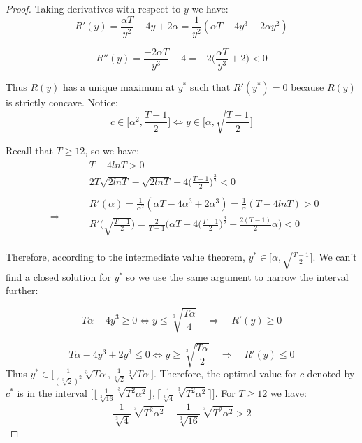 \documentclass[opre,nonblindrev]{informs3} %
\begin{document}
\begin{proof}
    Taking derivatives with respect to $y$ we have:
    \begin{equation}
        R'(y) = \frac{\alpha T}{y^2} - 4y + 2\alpha = \frac{1}{y^2}(\alpha T-4y^3+2\alpha y^2)
    \end{equation}
    
    \begin{equation}
        R''(y)=\frac{-2\alpha T}{y^3}-4=-2\bigg(\frac{\alpha T}{y^3}+2\bigg)<0
    \end{equation}
    
    Thus $R(y)$ has a unique maximum at $y^*$ such that $R'(y^*) = 0$ because $R(y)$ is strictly concave.
    Notice: 
    \begin{equation}
        c \in \bigg[\alpha^2, \frac{T-1}{2}\bigg] \iff y \in \bigg[\alpha, \sqrt{\frac{T-1}{2}}\bigg]
    \end{equation}
    
    Recall that $T\geq 12$, so we have:   
    \begin{align}
        &\begin{aligned}
            &T-4lnT > 0 \\
            &2T\sqrt{2lnT}-\sqrt{2lnT}-4\bigg(\frac{T-1}{2}\bigg)^{\frac{3}{2}} < 0
        \end{aligned} \\
        \quad \Longrightarrow \quad
        &\begin{aligned}
            &R'(\alpha) = \frac{1}{\alpha^2}(\alpha T-4\alpha^3+2\alpha^3)=\frac{1}{\alpha}(T-4lnT)>0 \\
            &R'\bigg(\sqrt{\frac{T-1}{2}}\bigg) = \frac{2}{T-1}\bigg(\alpha T -4\bigg(\frac{T-1}{2}\bigg)^{\frac{3}{2}} + \frac{2(T-1)}{2}\alpha\bigg) < 0
        \end{aligned}
    \end{align}
    
    Therefore, according to the intermediate value theorem, $y^* \in \bigg[\alpha, \sqrt{\frac{T-1}{2}}\bigg]$. We can't find a closed solution for $y^*$ so we use the same argument to narrow the interval further:

    \begin{equation}
        T\alpha-4y^3 \geq 0 \iff y \leq \sqrt[3]{\frac{T\alpha}{4}} \quad \Longrightarrow \quad R'(y) \geq 0
    \end{equation}
    
    \begin{equation}
        T\alpha-4y^3+2y^3 \leq 0 \iff y \geq \sqrt[3]{\frac{T\alpha}{2}} \quad \Longrightarrow \quad R'(y) \leq 0
    \end{equation}
    Thus $y^* \in \bigg[\frac{1}{(\sqrt[3]{2})^2}\sqrt[3]{T\alpha}, \frac{1}{\sqrt[3]{2}}\sqrt[3]{T\alpha}\bigg]$.
    Therefore, the optimal value for $c$ denoted by $c^*$ is in the interval $\bigg[\bigg\lfloor\frac{1}{\sqrt[3]{16}}\sqrt[3]{T^2\alpha^2}\bigg\rfloor, 
    \bigg\lceil\frac{1}{\sqrt[3]{4}}\sqrt[3]{T^2\alpha^2}\bigg\rceil\bigg]$. For $T\geq12$ we have:
    \begin{equation}
        \frac{1}{\sqrt[3]{4}}\sqrt[3]{T^2\alpha^2} -\frac{1}{\sqrt[3]{16}}\sqrt[3]{T^2\alpha^2} > 2
    \end{equation}


\end{proof}
\end{document}
